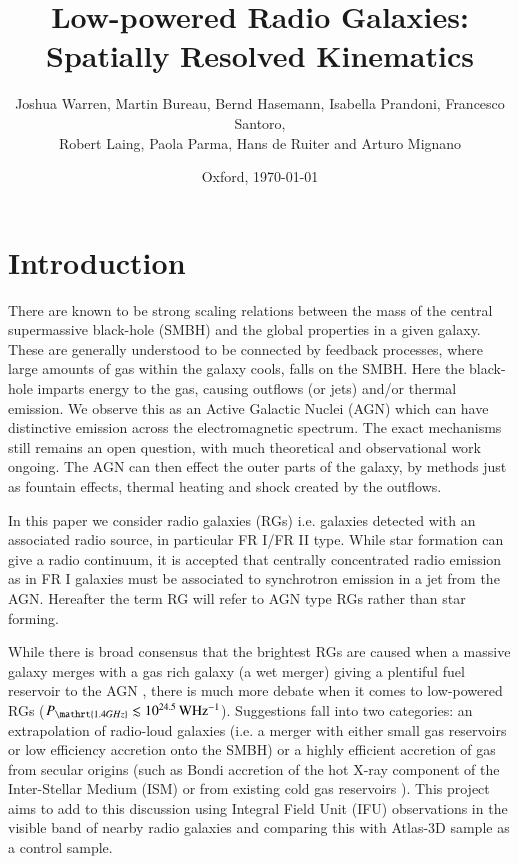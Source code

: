 \documentclass[a4paper,fleqn,usenatbib,useAMS]{mnras}
\begin{document}
\title{Low-powered Radio Galaxies: Spatially Resolved Kinematics}
\author{Joshua Warren, Martin Bureau, Bernd Hasemann, Isabella Prandoni, Francesco Santoro,\\ Robert Laing, Paola Parma, Hans de Ruiter and Arturo Mignano}
\date{Oxford, \today}


\maketitle


\section{Introduction}
	\label{sec:intro}
	There are known to be strong scaling relations between the mass of the central supermassive black-hole (SMBH) and the global properties in a given galaxy. These are generally understood to be connected by feedback processes, where large amounts of gas within the galaxy cools, falls on the SMBH. Here the black-hole imparts energy to the gas, causing outflows (or jets) and/or thermal emission. We observe this as an Active Galactic Nuclei (AGN) which can have distinctive emission across the electromagnetic spectrum. The exact mechanisms still remains an open question, with much theoretical and observational work ongoing. The AGN can then effect the outer parts of the galaxy, by methods just as fountain effects, thermal heating and shock created by the outflows.

	In this paper we consider radio galaxies (RGs) i.e. galaxies detected with an associated radio source, in particular FR I/FR II type. While star formation can give a radio continuum, it is accepted that centrally concentrated radio emission as in FR I galaxies must be associated to synchrotron emission in a jet from the AGN. Hereafter the term RG will refer to AGN type RGs rather than star forming.	

	While there is broad consensus \citep{Heckman1986, Baum1992} that the brightest RGs are caused when a massive galaxy merges with a gas rich galaxy (a wet merger) giving a plentiful fuel reservoir to the AGN \citep{Baum1992}, there is much more debate when it comes to low-powered RGs ($P_\mathrt{1.4 GHz} \lesssim 10^{24.5} \, \mathrm{W Hz^{-1}}$). Suggestions fall into two categories: an extrapolation of radio-loud galaxies (i.e. a merger with either small gas reservoirs or low efficiency accretion onto the SMBH) or a highly efficient accretion of gas from secular origins (such as Bondi accretion of the hot X-ray component of the Inter-Stellar Medium (ISM) \citep{Allen2006} or from existing cold gas reservoirs \citep{Prandoni2010}). This project aims to add to this discussion using Integral Field Unit (IFU) observations in the visible band of nearby radio galaxies and comparing this with Atlas-3D sample \citep{Cappellari2011} as a control sample.
\end{document}

